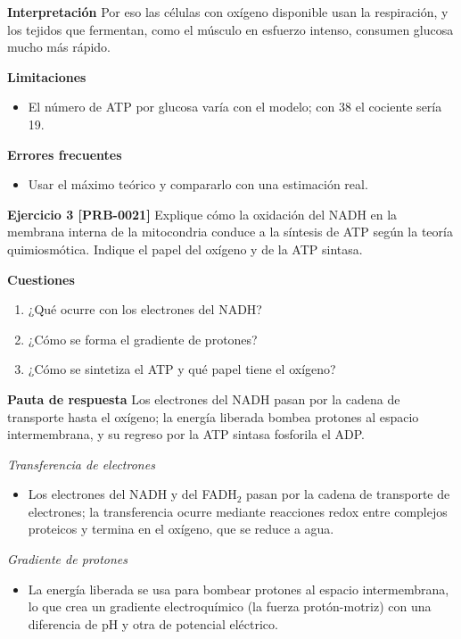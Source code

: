 \documentclass{book}
\begin{document}
\noindent\textbf{Interpretación}
Por eso las células con oxígeno disponible usan la respiración, y los tejidos que fermentan, como el músculo en esfuerzo intenso, consumen glucosa mucho más rápido.


\noindent\textbf{Limitaciones}
\begin{itemize}
\item El número de ATP por glucosa varía con el modelo; con 38 el cociente sería 19.
\end{itemize}

\noindent\textbf{Errores frecuentes}
\begin{itemize}
\item Usar el máximo teórico y compararlo con una estimación real.
\end{itemize}

\noindent\textbf{Ejercicio 3 [PRB-0021]}
Explique cómo la oxidación del NADH en la membrana interna de la mitocondria conduce a la síntesis de ATP según la teoría quimiosmótica. Indique el papel del oxígeno y de la ATP sintasa.


\noindent\textbf{Cuestiones}
\begin{enumerate}
\item ¿Qué ocurre con los electrones del NADH?
\item ¿Cómo se forma el gradiente de protones?
\item ¿Cómo se sintetiza el ATP y qué papel tiene el oxígeno?
\end{enumerate}

\noindent\textbf{Pauta de respuesta}
Los electrones del NADH pasan por la cadena de transporte hasta el oxígeno; la energía liberada bombea protones al espacio intermembrana, y su regreso por la ATP sintasa fosforila el ADP.


\noindent\textit{Transferencia de electrones}
\begin{itemize}
\item Los electrones del NADH y del FADH\({}_{2}\) pasan por la cadena de transporte de electrones; la transferencia ocurre mediante reacciones redox entre complejos proteicos y termina en el oxígeno, que se reduce a agua.
\end{itemize}

\noindent\textit{Gradiente de protones}
\begin{itemize}
\item La energía liberada se usa para bombear protones al espacio intermembrana, lo que crea un gradiente electroquímico (la fuerza protón-motriz) con una diferencia de pH y otra de potencial eléctrico.
\end{itemize}
\end{document}
